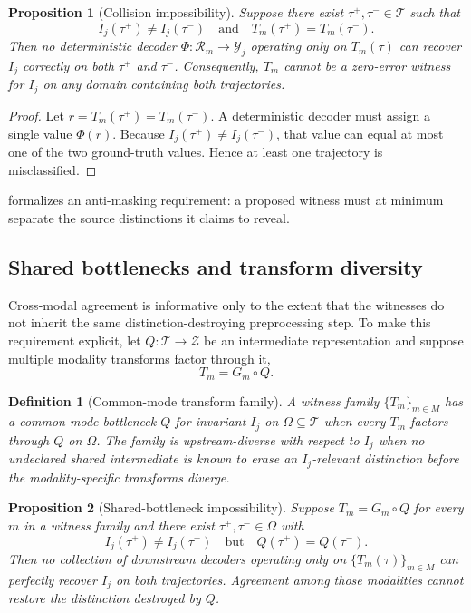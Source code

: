 \documentclass[11pt]{article}
\newtheorem{definition}{Definition}
\newtheorem{proposition}{Proposition}
\newcommand{\T}{\mathcal{T}}
\newcommand{\R}{\mathcal{R}}
\begin{document}
\begin{proposition}[Collision impossibility]
\label{prop:collision}
Suppose there exist $\tau^+,\tau^-\in\T$ such that
\begin{equation}
I_j(\tau^+)\neq I_j(\tau^-)
\quad\text{and}\quad
T_m(\tau^+)=T_m(\tau^-).
\end{equation}
Then no deterministic decoder $\Phi:\R_m\rightarrow\mathcal{Y}_j$ operating only on $T_m(\tau)$ can recover $I_j$ correctly on both $\tau^+$ and $\tau^-$. Consequently, $T_m$ cannot be a zero-error witness for $I_j$ on any domain containing both trajectories.
\end{proposition}

\begin{proof}
Let $r=T_m(\tau^+)=T_m(\tau^-)$. A deterministic decoder must assign a single value $\Phi(r)$. Because $I_j(\tau^+)\neq I_j(\tau^-)$, that value can equal at most one of the two ground-truth values. Hence at least one trajectory is misclassified.\qedhere
\end{proof}

 formalizes an anti-masking requirement: a proposed witness must at minimum separate the source distinctions it claims to reveal.

\subsection{Shared bottlenecks and transform diversity}
Cross-modal agreement is informative only to the extent that the witnesses do not inherit the same distinction-destroying preprocessing step. To make this requirement explicit, let $Q:\T\rightarrow\mathcal{Z}$ be an intermediate representation and suppose multiple modality transforms factor through it,
\begin{equation}
T_m = G_m \circ Q.
\end{equation}

\begin{definition}[Common-mode transform family]
A witness family $\{T_m\}_{m\in M}$ has a \emph{common-mode bottleneck} $Q$ for invariant $I_j$ on $\Omega\subseteq\T$ when every $T_m$ factors through $Q$ on $\Omega$. The family is \emph{upstream-diverse} with respect to $I_j$ when no undeclared shared intermediate is known to erase an $I_j$-relevant distinction before the modality-specific transforms diverge.
\end{definition}

\begin{proposition}[Shared-bottleneck impossibility]
\label{prop:shared-bottleneck}
Suppose $T_m=G_m\circ Q$ for every $m$ in a witness family and there exist $\tau^+,\tau^-\in\Omega$ with
\begin{equation}
I_j(\tau^+)\neq I_j(\tau^-)
\quad\text{but}\quad
Q(\tau^+)=Q(\tau^-).
\end{equation}
Then no collection of downstream decoders operating only on $\{T_m(\tau)\}_{m\in M}$ can perfectly recover $I_j$ on both trajectories. Agreement among those modalities cannot restore the distinction destroyed by $Q$.
\end{proposition}
\end{document}
